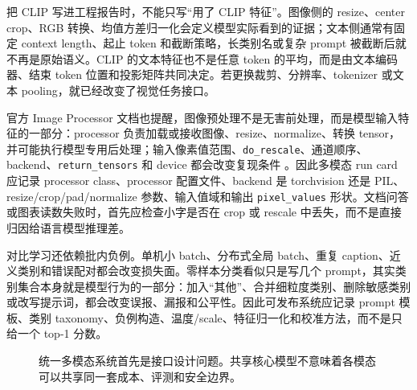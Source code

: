 \documentclass[UTF8,zihao=-4,openany]{ctexbook}
\begin{document}
把 CLIP 写进工程报告时，不能只写“用了 CLIP 特征”。图像侧的 resize、center crop、RGB 转换、均值方差归一化会定义模型实际看到的证据；文本侧通常有固定 context length、起止 token 和截断策略，长类别名或复杂 prompt 被截断后就不再是原始语义。CLIP 的文本特征也不是任意 token 的平均，而是由文本编码器、结束 token 位置和投影矩阵共同决定。若更换裁剪、分辨率、tokenizer 或文本 pooling，就已经改变了视觉任务接口。

官方 Image Processor 文档也提醒，图像预处理不是无害前处理，而是模型输入特征的一部分：processor 负责加载或接收图像、resize、normalize、转换 tensor，并可能执行模型专用后处理；输入像素值范围、\texttt{do\_rescale}、通道顺序、backend、\texttt{return\_tensors} 和 device 都会改变复现条件 \cite{huggingface2026transformersimageprocessor}。因此多模态 run card 应记录 processor class、processor 配置文件、backend 是 torchvision 还是 PIL、resize/crop/pad/normalize 参数、输入值域和输出 \texttt{pixel\_values} 形状。文档问答或图表读数失败时，首先应检查小字是否在 crop 或 rescale 中丢失，而不是直接归因给语言模型推理差。

对比学习还依赖批内负例。单机小 batch、分布式全局 batch、重复 caption、近义类别和错误配对都会改变损失面。零样本分类看似只是写几个 prompt，其实类别集合本身就是模型行为的一部分：加入“其他”、合并细粒度类别、删除敏感类别或改写提示词，都会改变误报、漏报和公平性。因此可发布系统应记录 prompt 模板、类别 taxonomy、负例构造、温度/scale、特征归一化和校准方法，而不是只给一个 top-1 分数。

\begin{figure}[t]
\centering
{}
\caption{统一多模态系统首先是接口设计问题。共享核心模型不意味着各模态可以共享同一套成本、评测和安全边界。}
\label{fig:zh-unified-multimodal-stack}
\end{figure}
\end{document}
